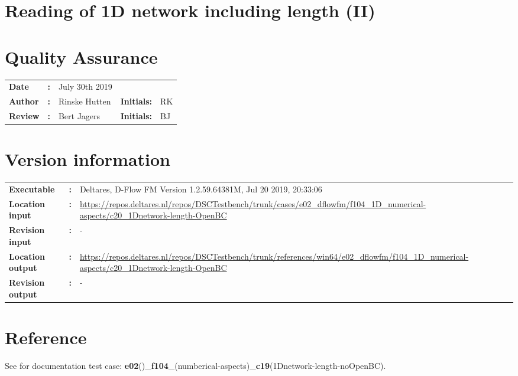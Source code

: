

\section{Reading of 1D network including length (II)}
\newrefsegment

\section*{Quality Assurance}
\begin{tabular}{@{}p{27mm}@{}p{0mm}p{\textwidth-52mm-48pt}p{15mm}p{10mm}}
\textbf{Date} & \textbf{:} &  July 30th 2019  \\ 
\textbf{Author} & \textbf{:} & Rinske Hutten & \textbf{Initials:} & RK \\
\textbf{Review} & \textbf{:} & Bert Jagers & \textbf{Initials:} & BJ
\end{tabular}

\section*{Version information}
{{
\begin{tabular}{@{}p{27mm}@{}p{0mm}p{\textwidth-27mm-24pt}}
\textbf{Executable}   & \textbf{:} & Deltares, D-Flow FM Version 1.2.59.64381M, Jul 20 2019, 20:33:06  \\
\textbf{Location input}     & \textbf{:} & \url{https://repos.deltares.nl/repos/DSCTestbench/trunk/cases/e02_dflowfm/f104_1D_numerical-aspects/c20_1Dnetwork-length-OpenBC} \\
\textbf{Revision input} & \textbf{:} & - \\
\textbf{Location output}     & \textbf{:} & \url{https://repos.deltares.nl/repos/DSCTestbench/trunk/references/win64/e02_dflowfm/f104_1D_numerical-aspects/c20_1Dnetwork-length-OpenBC} \\
\textbf{Revision output} & \textbf{:} & -
\end{tabular}
}}


\section*{Reference}
See for documentation test case: \textbf{e02}(\dflowfm)\_\textbf{f104}\_(numberical-aspects)\_\textbf{c19}(1Dnetwork-length-noOpenBC).

\printrefsegment

